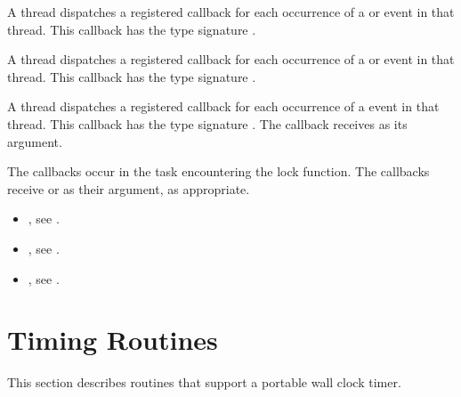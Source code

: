 A thread dispatches a registered 
callback for each occurrence of a  or  event 
in that thread.  This callback has the type signature .

A thread dispatches a registered 
callback for each occurrence of a  or  event 
in that thread.  This callback has the type signature .

A thread dispatches a registered 
callback for each occurrence of a  event 
in that thread. This callback has the type signature .
The callback receives  as its  argument.

The callbacks occur in the task encountering
the lock function.  The callbacks receive  or 
  as their  argument, as appropriate.


\crossreferences
\begin{itemize}
\item {}, see 
.
\item {}, see 
.
\item {}, see
.
\end{itemize}








\vspace{-24pt}


\section{Timing Routines}
\label{sec:Timing Routines}
This section describes routines that support a portable wall clock timer.

\vspace{-12pt}









